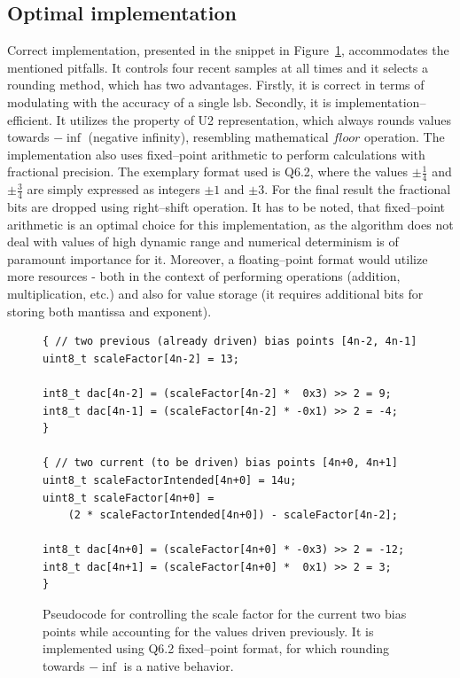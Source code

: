 \documentclass[journal,twoside,web]{ieeecolor}
\begin{document}
\subsection{Optimal implementation}
Correct implementation, presented in the snippet in Figure~\ref{fig:snippet_implementation}, accommodates the mentioned pitfalls. It controls four recent samples at all times and it selects a rounding method, which has two advantages. Firstly, it is correct in terms of modulating with the accuracy of a single lsb. Secondly, it is implementation--efficient. It utilizes the property of U2 representation, which always rounds values towards $-\inf$ (negative infinity), resembling mathematical $floor$ operation.
The implementation also uses fixed--point arithmetic to perform calculations with fractional precision. The exemplary format used is Q6.2, where the values $\pm\frac{1}{4}$ and $\pm\frac{3}{4}$ are simply expressed as integers $\pm1$ and $\pm3$. For the final result the fractional bits are dropped using right--shift operation. It has to be noted, that fixed--point arithmetic is an optimal choice for this implementation, as the algorithm does not deal with values of high dynamic range and numerical determinism is of paramount importance for it. Moreover, a floating--point format would utilize more resources - both in the context of performing operations (addition, multiplication, etc.) and also for value storage (it requires additional bits for storing both mantissa and exponent). 

\begin{figure}[ht]
    \centering
    {\scriptsize\begin{verbatim}
{ // two previous (already driven) bias points [4n-2, 4n-1]
uint8_t scaleFactor[4n-2] = 13;

int8_t dac[4n-2] = (scaleFactor[4n-2] *  0x3) >> 2 = 9;
int8_t dac[4n-1] = (scaleFactor[4n-2] * -0x1) >> 2 = -4;
}

{ // two current (to be driven) bias points [4n+0, 4n+1]
uint8_t scaleFactorIntended[4n+0] = 14u;
uint8_t scaleFactor[4n+0] = 
    (2 * scaleFactorIntended[4n+0]) - scaleFactor[4n-2];

int8_t dac[4n+0] = (scaleFactor[4n+0] * -0x3) >> 2 = -12;
int8_t dac[4n+1] = (scaleFactor[4n+0] *  0x1) >> 2 = 3;
}
    \end{verbatim}}
    \caption{Pseudocode for controlling the scale factor for the current two bias points while accounting for the values driven previously. It is implemented using Q6.2 fixed--point format, for which rounding towards $-\inf$ is a native behavior.}
    \label{fig:snippet_implementation}
\end{figure}
\end{document}
